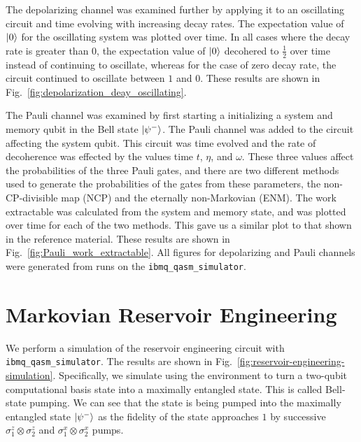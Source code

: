 \documentclass[12pt]{article}
\DeclarePairedDelimiter{\ket}{\lvert}{\rangle}
\begin{document}
  The depolarizing channel was examined further by applying it to an oscillating circuit and time evolving with increasing decay rates. The expectation value of \( \ket{0} \) for the oscillating system was plotted over time. In all cases where the decay rate is greater than \( 0 \), the expectation value of \( \ket{0} \) decohered to \( \frac{1}{2} \) over time instead of continuing to oscillate, whereas for the case of zero decay rate, the circuit continued to oscillate between \( 1 \) and \( 0 \). These results are shown in Fig.~\ref{fig:depolarization_deay_oscillating}.

  The Pauli channel was examined by first starting a initializing a system and memory qubit in the Bell state \( \ket{\psi^{-}} \). The Pauli channel was added to the circuit affecting the system qubit. This circuit was time evolved and the rate of decoherence was effected by the values time \( t \), \( \eta \), and \( \omega \). These three values affect the probabilities of the three Pauli gates, and there are two different methods used to generate the probabilities of the gates from these parameters, the non-CP-divisible map (NCP) and the eternally non-Markovian (ENM). The work extractable was calculated from the system and memory state, and was plotted over time for each of the two methods. This gave us a similar plot to that shown in the reference material. These results are shown in Fig.~\ref{fig:Pauli_work_extractable}. All figures for depolarizing and Pauli channels were generated from runs on the \texttt{ibmq\_qasm\_simulator}.

  \section{Markovian Reservoir Engineering}
  We perform a simulation of the reservoir engineering circuit with \texttt{ibmq\_qasm\_simulator}. The results are shown in Fig.~\ref{fig:reservoir-engineering-simulation}. Specifically, we simulate using the environment to turn a two-qubit computational basis state into a maximally entangled state. This is called Bell-state pumping. We can see that the state is being pumped into the maximally entangled state \( \ket{\psi^{-}} \) as the fidelity of the state approaches \( 1 \) by successive \( \sigma^{z}_{1} \otimes \sigma^{z}_{2} \) and \( \sigma^{x}_{1} \otimes \sigma^{x}_{2} \) pumps.
\end{document}
